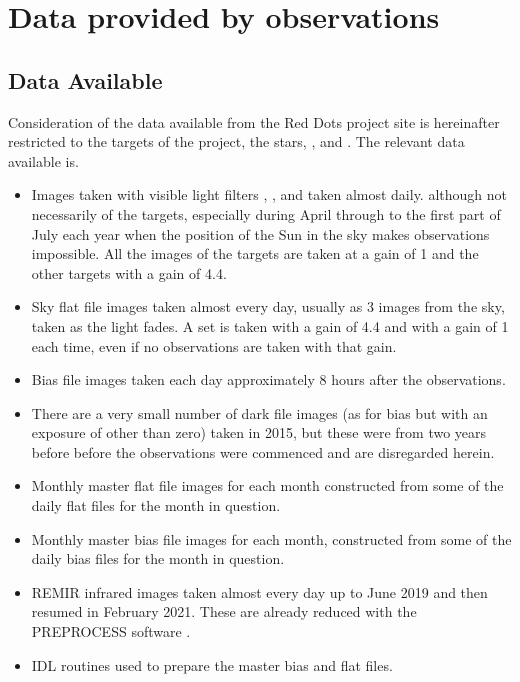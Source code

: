 \section{Data provided by {\rem} observations}
\protect\label{section:tdataprovided}

\subsection{Data Available}

Consideration of the data available from the Red Dots project site is
hereinafter restricted to the targets of the project, the {\rdwarf} stars,
\prox, {\bstar} and \ross. The relevant data available is.

\begin{itemize}
\item Images taken with visible light filters , ,
 and  taken almost daily. although not necessarily of the {\rem} {\rdwarf} targets,
especially during April through to the first part of July each year when the position of the Sun in the sky makes
observations impossible. All the images of the {\rem} {\rdwarf} targets are taken
at a gain of 1 and the other targets with a gain of 4.4.
\item Sky flat file images taken almost every day, usually as 3 images from the
sky, taken as the light fades. A set is taken with a gain of 4.4 and with a gain
of 1 each time, even if no observations are taken with that gain.
\item Bias file images taken each day
approximately 8 hours after the observations.
\item There are a very small number of dark file images (as for bias but with
an exposure of other than zero) taken in 2015, but these were from two years
before before the {\rdwarf} observations were commenced and are disregarded
herein.
\item Monthly master flat file images for each month constructed from some of
the daily flat files for the month in question.
\item Monthly master bias file images for each month, constructed from some of
the daily bias files for the month in question.
\item REMIR infrared images taken almost every day up to June 2019 and then
resumed in February 2021.
These are already reduced with the PREPROCESS software \citep{dipaola01}.
\item IDL routines used to prepare the master bias and flat files.
\end{itemize}

